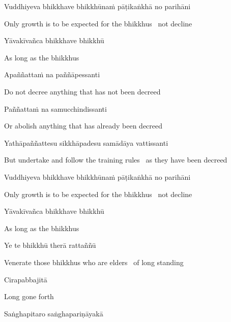 Vuddhiyeva bhikkhave bhikkhūnaṁ pāṭikaṅkhā no parihāni

\begin{english}
  Only growth is to be expected for the bhikkhus \breathmark\ not decline
\end{english}

Yāvakīvañca bhikkhave bhikkhū

\begin{english}
  As long as the bhikkhus
\end{english}

Apaññattaṁ na paññāpessanti

\begin{english}
  Do not decree anything that has not been decreed
\end{english}

Paññattaṁ na samucchindissanti

\begin{english}
  Or abolish anything that has already been decreed
\end{english}

Yathāpaññattesu sikkhāpadesu samādāya vattissanti

\begin{english-hang}
  But undertake and follow the training rules \breathmark\ as they have been decreed
\end{english-hang}

Vuddhiyeva bhikkhave bhikkhūnaṁ pāṭikaṅkhā no parihāni

\begin{english}
  Only growth is to be expected for the bhikkhus \breathmark\ not decline
\end{english}

Yāvakīvañca bhikkhave bhikkhū

\begin{english}
  As long as the bhikkhus
\end{english}

Ye te bhikkhū therā rattaññū

\begin{english}
  Venerate those bhikkhus who are elders \breathmark\ of long standing
\end{english}

Cirapabbajitā

\begin{english}
  Long gone forth
\end{english}

Saṅghapitaro saṅghapariṇāyakā

